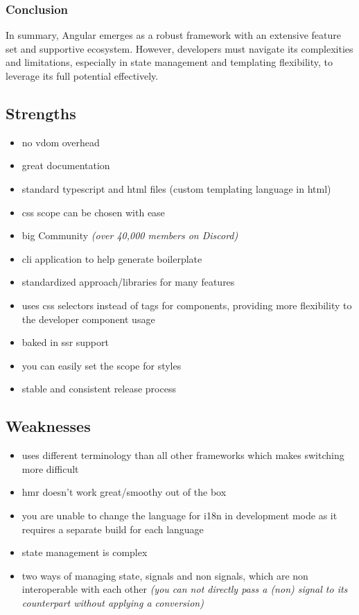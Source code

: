 \subsubsection{Conclusion}

In summary, Angular emerges as a robust framework with an extensive feature set and supportive ecosystem. However, developers must navigate its complexities and limitations, especially in state management and templating flexibility, to leverage its full potential effectively.

\subsection{Strengths}
\label{subsec:angular:strengths}
\begin{itemize}
    \item no \acrshort{vdom} overhead
    \item great documentation
    \item standard typescript and \acrshort{html} files (custom templating language in \acrshort{html})
    \item \acrshort{css} scope can be chosen with ease
    \item big Community \textit{(over 40,000 members on Discord)}
    \item \acrshort{cli} application to help generate boilerplate
    \item standardized approach/libraries for many features
    \item uses \acrshort{css} selectors instead of tags for components, providing more flexibility to the developer component usage
    \item baked in \acrshort{ssr} support
    \item you can easily set the scope for styles
    \item stable and consistent release process \cite{angular.dev:versioning_and_releases}
\end{itemize}

\subsection{Weaknesses}
\label{subsec:angular:weaknesses}
\begin{itemize}
    \item uses different terminology than all other frameworks which makes switching more difficult
    \item \acrshort{hmr} doesn't work great/smoothy out of the box
    \item you are unable to change the language for \acrshort{i18n} in development mode as it requires a separate build for each language
    \item state management is complex
    \item two ways of managing state, signals and non signals, which are non interoperable with each other \textit{(you can not directly pass a (non) signal to its counterpart without applying a conversion)}
\end{itemize}